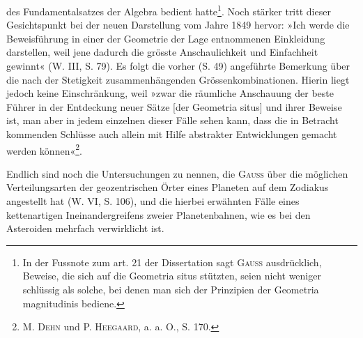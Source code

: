 des Fundamentalsatzes der Algebra bedient hatte\footnote{In der Fussnote zum art. 21 der Dissertation sagt \textsc{Gauss} ausdrücklich, Beweise, die sich auf die Geometria situs stützten, seien nicht weniger schlüssig als solche, bei denen man sich der Prinzipien der Geometria magnitudinis bediene.}. Noch stärker tritt dieser
Gesichtspunkt bei der neuen Darstellung vom Jahre 1849 hervor: »Ich werde
die Beweisführung in einer der Geometrie der Lage entnommenen Einkleidung
darstellen, weil jene dadurch die grösste Anschaulichkeit und Einfachheit
\clearpage{}\setcounter{footnote}{0}
\noindent gewinnt« (W. III, S. 79). Es folgt die vorher (S. 49) angeführte Bemerkung
über die nach der Stetigkeit zusammenhängenden Grössenkombinationen. Hierin
liegt jedoch keine Einschränkung, weil »zwar die räumliche Anschauung der
beste Führer in der Entdeckung neuer Sätze [der Geometria situs] und ihrer
Beweise ist, man aber in jedem einzelnen dieser Fälle sehen kann, dass die
in Betracht kommenden Schlüsse auch allein mit Hilfe abstrakter Entwicklungen
gemacht werden können«\footnote{M. \textsc{Dehn} und P. \textsc{Heegaard}, a. a. O., S. 170.}.
\par
Endlich sind noch die Untersuchungen zu nennen, die \textsc{Gauss} über die
möglichen Verteilungsarten der geozentrischen Örter eines Planeten auf dem
Zodiakus angestellt hat (W. VI, S. 106), und die hierbei erwähnten Fälle eines
kettenartigen Ineinandergreifens zweier Planetenbahnen, wie es bei den Asteroiden
mehrfach verwirklicht ist.
\clearpage\endgroup


